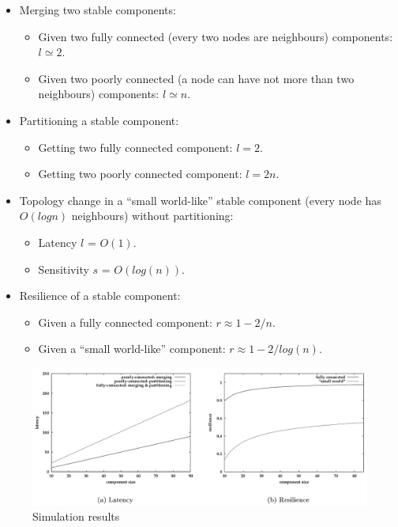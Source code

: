 \begin{itemize}
	\item Merging two stable components:
	
	\begin{itemize}
		\item Given two fully connected (every two nodes are neighbours) components: $l \simeq 2$.
		\item Given two poorly connected (a node can have not more than two neighbours) components: $l \simeq n$.
	\end{itemize}
	
	\item Partitioning a stable component:
	
	\begin{itemize}
		\item Getting two fully connected component: $l = 2$.
		\item Getting two poorly connected component: $l = 2n$.
	\end{itemize}
	
	\item Topology change in a “small world-like” stable component (every node has $O(log n)$ neighbours) without partitioning:
	\begin{itemize}
		\item Latency $l$ = $O(1)$.
		\item Sensitivity $s$ = $O(log(n))$.
	\end{itemize}
	
	\item Resilience of a stable component:
	
	\begin{itemize}
		\item Given a fully connected component: $r \approx 1 - 2/n$.
		\item Given a “small world-like” component: $r \approx 1 - 2/log(n)$.
	\end{itemize}
	
\end{itemize}


\begin{figure}[hbtp]
	\centering
	\includegraphics[scale=.4]{performance_test.png}
	\caption{Simulation results}
\end{figure}
